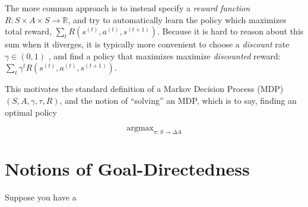 \documentclass{article}
\DeclareMathOperator{\argmax}{\arg\max}
\begin{document}
    The more common approach is to instead specify a \emph{reward function} $R : S \times A \times S \to \mathbb R$, and try to automatically learn the policy which maximizes total reward, $\sum_{t} R(s^{(t)}, a^{(t)}, s^{(t+1)})$. 
    Because it is hard to reason about this sum when it diverges, it is typically more convenient to choose a \emph{discount} rate $\gamma \in (0,1)$ , and find a policy that maximizes maximize \emph{discounted} reward:
    $
        \sum_{t} \gamma^t R(s^{(t)}, a^{(t)}, s^{(t+1)})
    $.
        
    This motivates the standard definition of a Markov Decision Process (MDP) $(S, A, \gamma, \tau, R)$, and the notion of ``solving'' an MDP, which is to say, finding an optimal policy
    
    \[ 
        \argmax_{\pi : S \to \Delta A}
    \]
        
    
    
    \section{Notions of Goal-Directedness}
    
    Suppose you have a 
    
    
    
    
    
\end{document}
